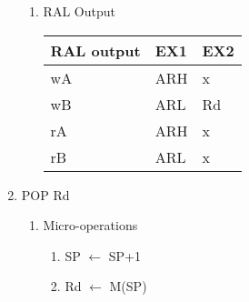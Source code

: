 \documentclass[12pt,letterpaper]{article}
\begin{document}
\begin{enumerate}
\begin{enumerate}
        \item RAL Output\\
            \begin{tabular}{l l l}
                 RAL output & EX1 & EX2 \\
                 \hline
                 wA & ARH & x  \\
                 wB & ARL & Rd\\
                 rA & ARH & x \\
                 rB & ARL & x \\
            \end{tabular}
    \end{enumerate}


    \item POP Rd
    \begin{enumerate}
        \item Micro-operations \\
            \begin{enumerate}[i]
                \item SP $\leftarrow$ SP+1
                \item Rd $\leftarrow$ M(SP)
            \end{enumerate}


\end{enumerate}
\end{enumerate}
\end{document}
